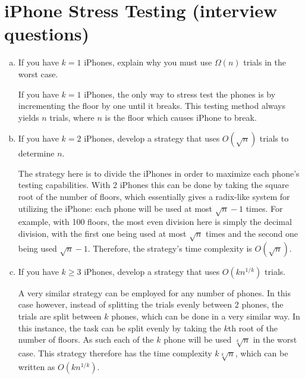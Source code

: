 \documentclass[12pt]{article}
\begin{document}
\section{iPhone Stress Testing (interview questions)}\label{iphone stress testing}
\begin{enumerate}[(a)]
\item If you have $k = 1$ iPhones, explain why you must use $\Omega(n)$ trials in the worst case.
\begin{addmargin}[2em]{2em}
If you have $k = 1$ iPhones, the only way to stress test the phones is by incrementing the floor by one until it breaks. This testing method always yields $n$ trials, where $n$ is the floor which causes iPhone to break.
\end{addmargin}
\item If you have $k = 2$ iPhones, develop a strategy that uses $O(\sqrt{n})$ trials to determine $n$.
\begin{addmargin}[2em]{2em}
The strategy here is to divide the iPhones in order to maximize each phone's testing capabilities. With 2 iPhones this can be done by taking the square root of the number of floors, which essentially gives a radix-like system for utilizing the iPhone: each phone will be used at most $\sqrt{n} - 1$ times. For example, with 100 floors, the most even division here is simply the decimal division, with the first one being used at most $\sqrt{n}$ times and the second one being used $\sqrt{n} - 1$. Therefore, the strategy's time complexity is $O(\sqrt{n})$.
\end{addmargin}
\item If you have $k \geq 3$ iPhones, develop a strategy that uses $O(k n^{1/k})$ trials.
\begin{addmargin}[2em]{2em}
A very similar strategy can be employed for any number of phones. In this case however, instead of splitting the trials evenly between 2 phones, the trials are split between $k$ phones, which can be done in a very similar way. In this instance, the task can be split evenly by taking the $k$th root of the number of floors. As such each of the $k$ phone will be used $\sqrt[k]{n}$ in the worst case. This strategy therefore has the time complexity $k\sqrt[k]{n}$, which can be written as $O(k n^{1/k})$.
\end{addmargin}
\end{enumerate}
\end{document}
